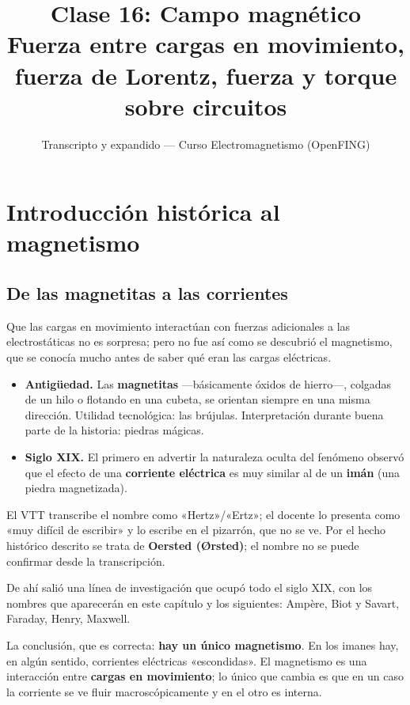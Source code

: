 \documentclass[12pt,a4paper]{article}
\title{\textbf{Clase 16: Campo magnético} \\[0.3em]
        \large{Fuerza entre cargas en movimiento, fuerza de Lorentz, fuerza y torque sobre circuitos}}
\author{Transcripto y expandido --- Curso Electromagnetismo (OpenFING)}
\date{}
\begin{document}
\maketitle
\thispagestyle{empty}
\newpage

\tableofcontents
\newpage

\section{Introducción histórica al magnetismo}

\subsection{De las magnetitas a las corrientes}

Que las cargas en movimiento interactúan con fuerzas adicionales a las
electrostáticas no es sorpresa; pero no fue así como se descubrió el
magnetismo, que se conocía mucho antes de saber qué eran las cargas eléctricas.

\begin{itemize}
  \item \textbf{Antigüedad.} Las \textbf{magnetitas} ---básicamente óxidos de hierro---, colgadas
  de un hilo o flotando en una cubeta, se orientan siempre en una misma
  dirección. Utilidad tecnológica: las brújulas. Interpretación durante buena
  parte de la historia: piedras mágicas.
  \item \textbf{Siglo XIX.} El primero en advertir la naturaleza oculta del fenómeno
  observó que el efecto de una \textbf{corriente eléctrica} es muy similar al de un
  \textbf{imán} (una piedra magnetizada).
\end{itemize}

\begin{notebox}
El VTT transcribe el nombre como «Hertz»/«Ertz»; el docente lo presenta como
«muy difícil de escribir» y lo escribe en el pizarrón, que no se ve. Por el
hecho histórico descrito se trata de \textbf{Oersted (Ørsted)}; el nombre no se
puede confirmar desde la transcripción.
\end{notebox}

De ahí salió una línea de investigación que ocupó todo el siglo XIX, con los
nombres que aparecerán en este capítulo y los siguientes: Ampère, Biot y
Savart, Faraday, Henry, Maxwell.

La conclusión, que es correcta: \textbf{hay un único magnetismo}. En los imanes hay,
en algún sentido, corrientes eléctricas «escondidas». El magnetismo es una
interacción entre \textbf{cargas en movimiento}; lo único que cambia es que en un
caso la corriente se ve fluir macroscópicamente y en el otro es interna.
\end{document}
